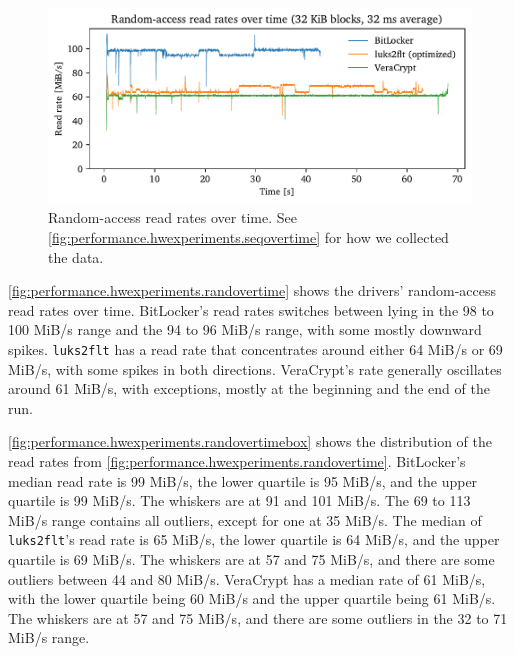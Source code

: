 \begin{figure}[htb!]
	\center
	\includegraphics[scale=1]{../fig/performance.hwexperiments.randovertime.pdf}
	\caption[
		Random-access read rates over time
	]{
		Random-access read rates over time. See \autoref{fig:performance.hwexperiments.seqovertime} for how we collected the data.
	}
	\label{fig:performance.hwexperiments.randovertime}
\end{figure}

\autoref{fig:performance.hwexperiments.randovertime} shows the drivers' random-access read rates over time. BitLocker's read rates switches between lying in the 98 to 100 MiB/s range and the 94 to 96 MiB/s range, with some mostly downward spikes. \texttt{luks2flt} has a read rate that concentrates around either 64 MiB/s or 69 MiB/s, with some spikes in both directions. VeraCrypt's rate generally oscillates around 61 MiB/s, with exceptions, mostly at the beginning and the end of the run.

\autoref{fig:performance.hwexperiments.randovertimebox} shows the distribution of the read rates from \autoref{fig:performance.hwexperiments.randovertime}. BitLocker's median read rate is 99 MiB/s, the lower quartile is 95 MiB/s, and the upper quartile is 99 MiB/s. The whiskers are at 91 and 101 MiB/s. The 69 to 113 MiB/s range contains all outliers, except for one at 35 MiB/s. The median of \texttt{luks2flt}'s read rate is 65 MiB/s, the lower quartile is 64 MiB/s, and the upper quartile is 69 MiB/s. The whiskers are at 57 and 75 MiB/s, and there are some outliers between 44 and 80 MiB/s. VeraCrypt has a median rate of 61 MiB/s, with the lower quartile being 60 MiB/s and the upper quartile being 61 MiB/s. The whiskers are at 57 and 75 MiB/s, and there are some outliers in the 32 to 71 MiB/s range.

